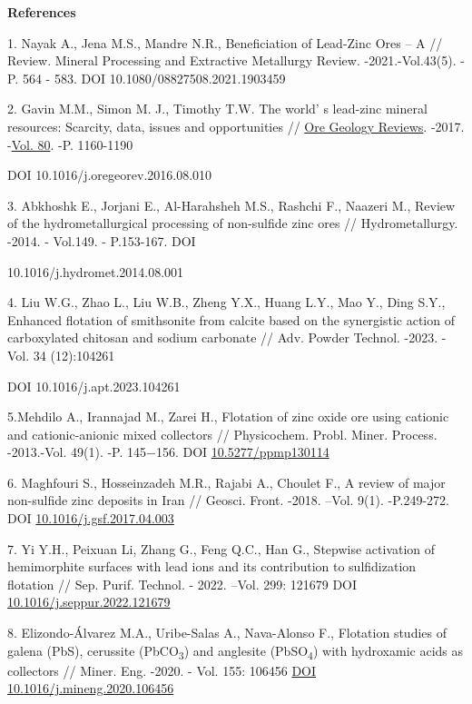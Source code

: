 \begin{center}
{\bfseries References}
\end{center}

\begin{references}
1. Nayak A., Jena M.S., Mandre N.R., Beneficiation of Lead-Zinc Ores -- A
// Review. Mineral Processing and Extractive Metallurgy Review.
-2021.-Vol.43(5). -P. 564 - 583. DOI 10.1080/08827508.2021.1903459

2. Gavin M.M., Simon M. J., Timothy T.W. The world' s
lead-zinc mineral resources: Scarcity, data, issues and opportunities
//
\href{https://www.sciencedirect.com/journal/ore-geology-reviews}{Ore
Geology Reviews}. -2017.
-\href{file:///C:/Users/admin/Desktop/Вестник\%20КазУТБ/Vol.\%2080}{Vol.
80}. -P. 1160-1190

DOI 10.1016/j.oregeorev.2016.08.010

3. Abkhoshk E., Jorjani E., Al-Harahsheh M.S., Rashchi F., Naazeri M.,
Review of the hydrometallurgical processing of non-sulfide zinc ores
// Hydrometallurgy. -2014. - Vol.149. - P.153-167. DOI

10.1016/j.hydromet.2014.08.001

4. Liu W.G., Zhao L., Liu W.B., Zheng Y.X., Huang L.Y., Mao Y., Ding
S.Y., Enhanced flotation of smithsonite from calcite based on the
synergistic action of carboxylated chitosan and sodium carbonate //
Adv. Powder Technol. -2023. -Vol. 34 (12):104261

DOI 10.1016/j.apt.2023.104261

5.Mehdilo A., Irannajad M., Zarei H., Flotation of zinc oxide ore using
cationic and cationic-anionic mixed collectors // Physicochem. Probl.
Miner. Process. -2013.-Vol. 49(1). -P. 145−156. DOI
\href{http://dx.doi.org/10.5277/ppmp130114}{10.5277/ppmp130114}

6. Maghfouri S., Hosseinzadeh M.R., Rajabi A., Choulet F., A review of
major non-sulfide zinc deposits in Iran // Geosci. Front. -2018. --Vol.
9(1). -P.249-272. DOI
\href{https://doi.org/10.1016/j.gsf.2017.04.003}{10.1016/j.gsf.2017.04.003}

7. Yi Y.H., Peixuan Li, Zhang G., Feng Q.C., Han G., Stepwise activation
of hemimorphite surfaces with lead ions and its contribution to
sulfidization flotation // Sep. Purif. Technol. - 2022. --Vol. 299:
121679 DOI
\href{https://doi.org/10.1016/j.seppur.2022.121679}{10.1016/j.seppur.2022.121679}

8. Elizondo-Álvarez M.A., Uribe-Salas A., Nava-Alonso F., Flotation
studies of galena (PbS), cerussite (PbCO\textsubscript{3}) and anglesite
(PbSO\textsubscript{4}) with hydroxamic acids as collectors // Miner.
Eng. -2020. - Vol. 155: 106456
\href{https://doi.org/10.1016/j.mineng.2020.106456}{DOI
10.1016/j.mineng.2020.106456}


\end{references}
